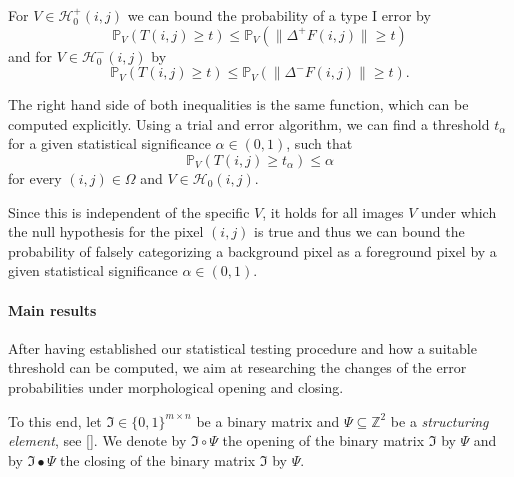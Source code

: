 \documentclass[a4paper,12pt]{article}
\newcommand{\norm}[1]{\lVert#1\rVert}
\theoremstyle{plain}
\theoremstyle{definition}
\begin{document}
For $V \in \mathcal{H}_0^+(i, j)$ we can bound the probability of a type I error by
\begin{equation*}
	\mathbb{P}_V( T(i, j) \geq t ) \leq \mathbb{P}_V( \norm{\Delta^+ F(i, j)} \geq t )
\end{equation*}
and for $V \in \mathcal{H}_0^-(i, j)$ by
\begin{equation*}
	\mathbb{P}_V( T(i, j) \geq t ) \leq \mathbb{P}_V( \norm{\Delta^- F(i, j)} \geq t ).
\end{equation*}

The right hand side of both inequalities is the same function, which can be computed explicitly. Using a trial and error algorithm, we can find a threshold $t_\alpha$ for a given statistical significance $\alpha \in ( 0, 1 )$, such that
\begin{equation*}
	\mathbb{P}_V( T(i, j) \geq t_\alpha ) \leq \alpha
\end{equation*}
for every $(i, j) \in \Omega$ and $V \in \mathcal{H}_0(i, j)$.

Since this is independent of the specific $V$, it holds for all images $V$ under which the null hypothesis for the pixel $(i, j)$ is true and thus we can bound the probability of falsely categorizing a background pixel as a foreground pixel by a given statistical significance $\alpha \in ( 0, 1 )$.

\paragraph{Main results}

After having established our statistical testing procedure and how a suitable threshold can be computed, we aim at researching the changes of the error probabilities under morphological opening and closing.

To this end, let $\mathfrak{I} \in \{ 0, 1 \}^{m \times n}$ be a binary matrix and $\Psi \subseteq \mathbb{Z}^2$ be a \emph{structuring element}, see []. We denote by $\mathfrak{I} \circ \Psi$ the opening of the binary matrix $\mathfrak{I}$ by $\Psi$ and by $\mathfrak{I} \bullet \Psi$ the closing of the binary matrix $\mathfrak{I}$ by $\Psi$.
\end{document}
